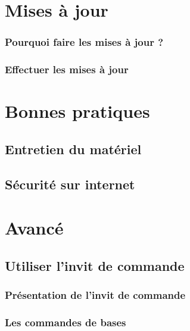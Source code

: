 \documentclass[12pt]{book}
\begin{document}
\newpage
\chapter{Mises à jour}
	\subsection{Pourquoi faire les mises à jour ?}
	\subsection{Effectuer les mises à jour}

\newpage
\chapter{Bonnes pratiques}
	\section{Entretien du matériel}
	\section{Sécurité sur internet}

\newpage
\chapter{Avancé}
\section{Utiliser l'invit de commande}
	\subsection{Présentation de l'invit de commande}
	\subsection{Les commandes de bases}
\end{document}
